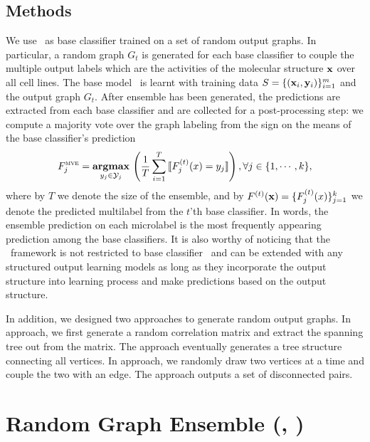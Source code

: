 {%
%
\subsection{Methods}

We use \mmcrf\ as base classifier trained on a set of random output graphs.
In particular, a random graph $G_t$ is generated for each base classifier to couple the multiple output labels which are the activities of the molecular structure $\mathbf {x}$ over all cell lines.
The base model \mmcrf\ is learnt with training data $S=\{(\mathbf {x}_i,\mathbf {y}_i)\}_{i=1}^{m}$ and the output graph $G_t$.
After ensemble has been generated, the predictions are extracted from each base classifier and are collected for a post-processing step: we compute a majority vote over the graph labeling from the sign on the means of the base classifier's prediction
\begin{align*}
	F_j^{\text{{\sc mve}}}=\underset{y_j\in\mathcal{Y}_j}{\textbf{argmax}}\,\left(\frac{1}{T}\sum_{i=1}^{T}{\llbracket F_j^{(t)}(x)=y_j \rrbracket}\right), \forall j\in\{1,\cdots,k\},
\end{align*}
where by $T$ we denote the size of the ensemble, and by $F^{(t)}(\mathbf {x})=\{F^{(t)}_j(x)\}_{j=1}^{k}$ we denote the predicted multilabel from the $t$'th base classifier.
In words, the ensemble prediction on each microlabel is the most frequently appearing prediction among the base classifiers.
It is also worthy of noticing that the \mve\ framework is not restricted to base classifier \mmcrf\ and can be extended with any structured output learning models as long as they incorporate the output structure into learning process and make predictions based on the output structure.

In addition, we designed two approaches to generate random output graphs.
In  approach, we first generate a random correlation matrix and extract the spanning tree out from the matrix.
The approach eventually generates a tree structure connecting all vertices.
In  approach, we randomly draw two vertices at a time and couple the two with an edge.
The approach outputs a set of disconnected pairs.



%
%
\section{Random Graph Ensemble (\amm, \mam)} \label{sc_su14b}

}
